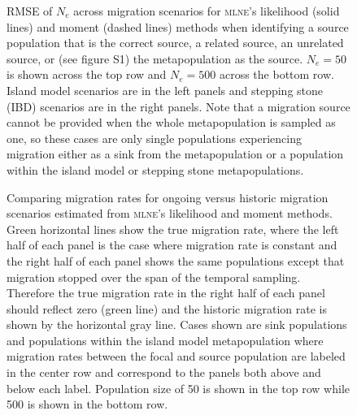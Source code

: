 \begin{figure}[h!]
\centering
{}
\caption[RMSE of $N_e$ across migration scenarios.]{RMSE of $N_e$ across migration scenarios for \textsc{mlne}'s likelihood (solid lines) and moment (dashed lines) methods when identifying a source population that is the correct source, a related source, an unrelated source, or (see figure S1) the metapopulation as the source. $N_e = 50$ is shown across the top row and $N_e = 500$ across the bottom row. Island model scenarios are in the left panels and stepping stone (IBD) scenarios are in the right panels. Note that a migration source cannot be provided when the whole metapopulation is sampled as one, so these cases are only single populations experiencing migration either as a sink from the metapopulation or a population within the island model or stepping stone metapopulations.}
\label{fig:supp_rmsemig}
\end{figure}


\begin{figure}[h!]
\centering
{}
\caption[Comparing migration rates for ongoing versus historic migration scenarios.]{Comparing migration rates for ongoing versus historic migration scenarios estimated from \textsc{mlne}'s likelihood and moment methods. Green horizontal lines show the true migration rate, where the left half of each panel is the case where migration rate is constant and the right half of each panel shows the same populations except that migration stopped over the span of the temporal sampling. Therefore the true migration rate in the right half of each panel should reflect zero (green line) and the historic migration rate is shown by the horizontal gray line. Cases shown are sink populations and populations within the island model metapopulation where migration rates between the focal and source population are labeled in the center row and correspond to the panels both above and below each label. Population size of 50 is shown in the top row while 500 is shown in the bottom row.}
\label{fig:supp_compmig}
\end{figure}